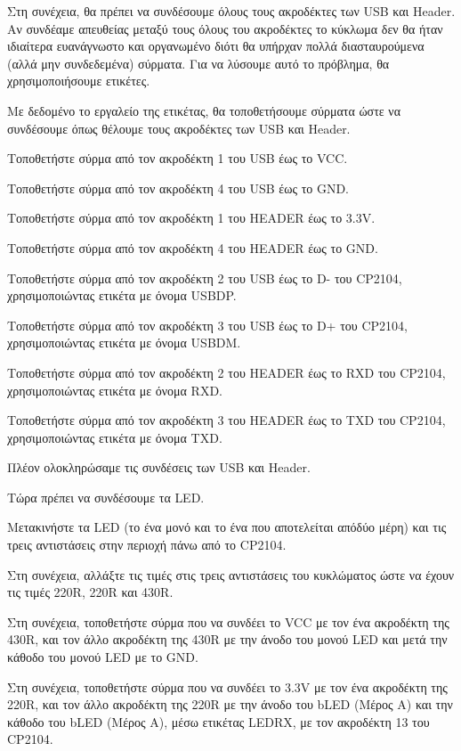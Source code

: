 \documentclass[a4paper]{article}
\begin{document}
Στη συνέχεια, θα πρέπει να συνδέσουμε όλους τους ακροδέκτες των USB και Header. Αν συνδέαμε απευθείας μεταξύ τους όλους του ακροδέκτες το κύκλωμα δεν θα ήταν ιδιαίτερα ευανάγνωστο και οργανωμένο διότι θα υπήρχαν πολλά διασταυρούμενα (αλλά μην συνδεδεμένα) σύρματα. Για να λύσουμε αυτό το πρόβλημα, θα χρησιμοποιήσουμε ετικέτες.

Με δεδομένο το εργαλείο της ετικέτας, θα τοποθετήσουμε σύρματα ώστε να συνδέσουμε όπως θέλουμε τους ακροδέκτες των USB και Header.

Τοποθετήστε σύρμα από τον ακροδέκτη 1 του USB έως το VCC.

Τοποθετήστε σύρμα από τον ακροδέκτη 4 του USB έως το GND.

Τοποθετήστε σύρμα από τον ακροδέκτη 1 του HEADER έως το 3.3V.

Τοποθετήστε σύρμα από τον ακροδέκτη 4 του HEADER έως το GND.

Τοποθετήστε σύρμα από τον ακροδέκτη 2 του USB έως το D- του \textenglish{CP2104}, χρησιμοποιώντας ετικέτα με όνομα USBDP. 

Τοποθετήστε σύρμα από τον ακροδέκτη 3 του USB έως το D+ του \textenglish{CP2104}, χρησιμοποιώντας ετικέτα με όνομα USBDM.

Τοποθετήστε σύρμα από τον ακροδέκτη 2 του HEADER έως το RXD του \textenglish{CP2104}, χρησιμοποιώντας ετικέτα με όνομα RXD.

Τοποθετήστε σύρμα από τον ακροδέκτη 3 του HEADER έως το TXD του \textenglish{CP2104}, χρησιμοποιώντας ετικέτα με όνομα TXD.

Πλέον ολοκληρώσαμε τις συνδέσεις των USB και Header.

Τώρα πρέπει να συνδέσουμε τα \textenglish{LED}. 

Μετακινήστε τα \textenglish{LED} (το ένα μονό και το ένα που αποτελείται απόδύο μέρη) και τις τρεις αντιστάσεις στην περιοχή πάνω από το \textenglish{CP2104}.

Στη συνέχεια, αλλάξτε τις τιμές στις τρεις αντιστάσεις του κυκλώματος ώστε να έχουν τις τιμές 220R, 220R και 430R.

Στη συνέχεια, τοποθετήστε σύρμα που να συνδέει το VCC με τον ένα ακροδέκτη της 430R, και τον άλλο ακροδέκτη της 430R με την άνοδο του μονού \textenglish{LED} και μετά την κάθοδο του μονού \textenglish{LED} με το GND.

Στη συνέχεια, τοποθετήστε σύρμα που να συνδέει το 3.3V με τον ένα ακροδέκτη της 220R, και τον άλλο ακροδέκτη της 220R με την άνοδο του b\textenglish{LED} (Μέρος Α) και την κάθοδο του b\textenglish{LED} (Μέρος Α), μέσω ετικέτας \textenglish{LED}RX, με τον ακροδέκτη 13 του \textenglish{CP2104}.
\end{document}
